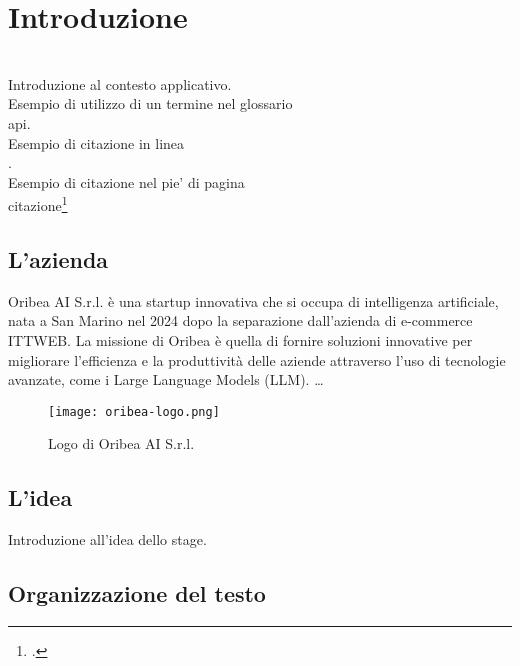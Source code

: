 \chapter{Introduzione}
\label{cap:introduzione}

\\

\noindent Introduzione al contesto applicativo.\\

\noindent Esempio di utilizzo di un termine nel glossario \\
\gls{api}. \\

\noindent Esempio di citazione in linea \\
\cite{site:agile-manifesto}. \\

\noindent Esempio di citazione nel pie' di pagina \\
citazione\footcite{womak:lean-thinking} \\

\section{L'azienda}

Oribea AI S.r.l. è una startup innovativa che si occupa di intelligenza artificiale, nata a San Marino nel 2024 dopo la separazione dall'azienda di e-commerce ITTWEB. La missione di Oribea è quella di fornire soluzioni innovative per migliorare l'efficienza e la produttività delle aziende attraverso l'uso di tecnologie avanzate, come i Large Language Models (LLM).
\dots

\begin{figure}
    \centering
    \texttt{[image: oribea-logo.png]}
    \caption{Logo di Oribea AI S.r.l.}
    \label{fig:oribea-logo}
\end{figure}

\section{L'idea}

Introduzione all'idea dello stage.

\section{Organizzazione del testo}

